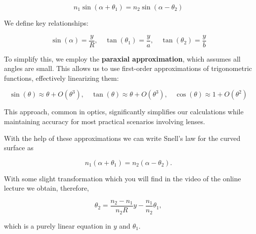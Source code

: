 \documentclass[
  a4paper,
]{book}
\begin{document}
\[n_{1}\sin(\alpha+\theta_1)=n_{2}\sin(\alpha-\theta_2)\]

We define key relationships:

\[\sin(\alpha)=\frac{y}{R}, \quad \tan(\theta_1)=\frac{y}{a}, \quad \tan(\theta_2)=\frac{y}{b}\]

To simplify this, we employ the \textbf{paraxial approximation}, which
assumes all angles are small. This allows us to use first-order
approximations of trigonometric functions, effectively linearizing them:

\[\sin(\theta) \approx \theta+ O(\theta^{3}), \quad \tan(\theta) \approx \theta + O(\theta^{3}),\quad \cos(\theta)\approx 1 + O(\theta^{2})\]

This approach, common in optics, significantly simplifies our
calculations while maintaining accuracy for most practical scenarios
involving lenses.

With the help of these approximations we can write Snell's law for the
curved surface as

\[n_1(\alpha+\theta_1)=n_2(\alpha-\theta_2).\]

With some slight transformation which you will find in the video of the
online lecture we obtain, therefore,

\[\theta_2=\frac{n_2-n_1}{n_2 R}y -\frac{n_1}{n_2}\theta_1,\]

which is a purely linear equation in \(y\) and \(\theta_1\).
\end{document}
